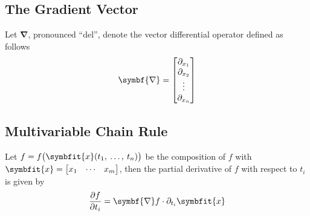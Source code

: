 \documentclass{article}
\begin{document}
\subsection{The Gradient Vector}
\begin{definition}
    Let $\symbf{\nabla}$, pronounced ``del'', denote the vector differential
    operator defined as follows
    \begin{equation*}
        \symbf{\nabla} = \mqty[\partial_{x_1} \\ \partial_{x_2} \\ \vdots \\ \partial_{x_n}]
    \end{equation*}
\end{definition}
\subsection{Multivariable Chain Rule}
\begin{definition}
    Let $f=f\bigl(\symbfit{x}(t_1,\: \ldots,\: t_n)\bigr)$ be the composition of $f$ with
    $\symbfit{x}=\mqty[x_1 & \cdots & x_m]$, then the partial derivative of $f$
    with respect to $t_i$ is given by
    \begin{equation*}
        \pdv{f}{t_i} = \symbf{\nabla}f \cdot \partial_{t_i}\symbfit{x}
    \end{equation*}
\end{definition}
\end{document}
